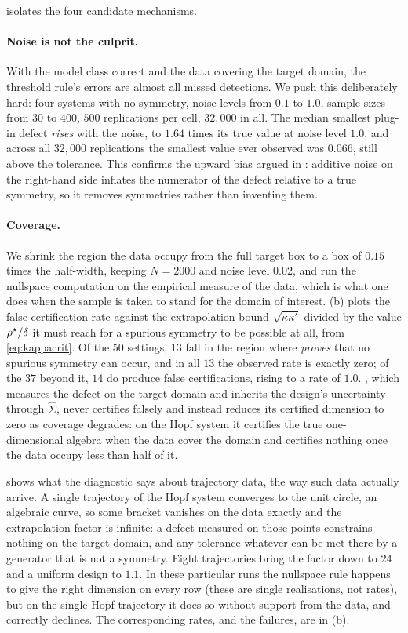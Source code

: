  isolates the four candidate mechanisms.

\paragraph{Noise is not the culprit.} With the model class correct and the
data covering the target domain, the threshold rule's errors are almost all
missed detections. We push this deliberately hard: four systems with no
symmetry, noise levels from $0.1$ to $1.0$, sample sizes from $30$ to $400$,
$500$ replications per cell, $32{,}000$ in all. The median smallest plug-in
defect \emph{rises} with the noise, to $1.64$ times its true value at noise
level $1.0$, and across all $32{,}000$ replications the smallest value ever
observed was $0.066$, still above the tolerance. This confirms the upward bias
argued in : additive noise on the right-hand side
inflates the numerator of the defect relative to a true symmetry, so it
removes symmetries rather than inventing them.

\paragraph{Coverage.} We shrink the region the data occupy from the full
target box to a box of $0.15$ times the half-width, keeping $N=2000$ and noise
level $0.02$, and run the nullspace computation on the empirical measure of
the data, which is what one does when the sample is taken to stand for the
domain of interest. (b) plots the false-certification rate
against the extrapolation bound $\sqrt{\kappa\kappa'}$ divided by the value
$\rho^\star/\delta$ it must reach for a spurious symmetry to be possible at
all, from \eqref{eq:kappacrit}. Of the $50$ settings, $13$ fall in the region
where  \emph{proves} that no spurious symmetry can occur, and
in all $13$ the observed rate is exactly zero; of the $37$ beyond it, $14$ do
produce false certifications, rising to a rate of $1.0$. \symcert{}, which
measures the defect on the target domain and inherits the design's uncertainty
through $\hat\Sigma$, never certifies falsely and instead reduces its
certified dimension to zero as coverage degrades: on the Hopf system it
certifies the true one-dimensional algebra when the data cover the domain and
certifies nothing once the data occupy less than half of it.

 shows what the diagnostic says about trajectory data,
the way such data actually arrive. A single trajectory of the Hopf system
converges to the unit circle, an algebraic curve, so some bracket vanishes on
the data exactly and the extrapolation factor is infinite: a defect measured
on those points constrains nothing on the target domain, and any tolerance
whatever can be met there by a generator that is not a symmetry. Eight
trajectories bring the factor down to $24$ and a uniform design to $1.1$. In
these particular runs the nullspace rule happens to give the right dimension
on every row (these are single realisations, not rates), but on the single
Hopf trajectory it does so without support from the data, and \symcert{}
correctly declines. The corresponding rates, and the failures, are in
(b).

